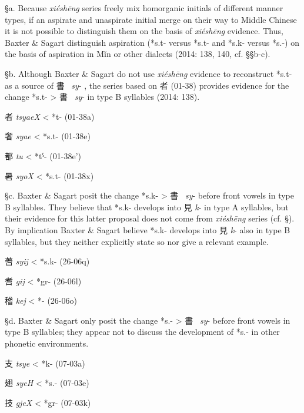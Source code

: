 §a. Because  \emph{xiéshēng} series freely mix homorganic initials of
different manner types, if an aspirate and unaspirate initial merge on
their way to Middle Chinese it is not possible to distinguish them on
the basis of  \emph{xiéshēng} evidence. Thus, Baxter \& Sagart
distinguish aspiration (*s.t- versus *s.t{}- and *s.k- versus *s.{}-) on
the basis of aspiration in Mǐn or other dialects (2014: 138, 140, cf.
§§b-c).

§b. Although Baxter \& Sagart do not use  \emph{xiéshēng} evidence to
reconstruct *s.t- as a source of 書~ \emph{sy}- 
\citeyearpar[135]{Baxter2014OldChinese}, the series
based on 者 (01-38) provides evidence for the change *s.t{}-
\textgreater{} 書~ \emph{sy}- in type B syllables (2014: 138).

\begin{description} \item
者  \emph{tsyaeX} \textless{} *t- (01-38a)
 \item
奢  \emph{syae} \textless{} *s.t{}- (01-38e)
\item
都  \emph{tu} \textless{} *tˁ- (01-38e')
 \item
暑  \emph{syoX} \textless{} *s.t{}- (01-38x)
\end{description}

§c. Baxter \& Sagart posit the change *s.k- \textgreater{} 書~ \emph{sy}-
before front vowels in type B syllables. They believe that *s.k-
develops into 見 \emph{k}- in type A syllables, but their evidence for
this latter proposal does not come from  \emph{xiéshēng} series (cf. §).
By implication Baxter \& Sagart believe *s.k- develops into 見 \emph{k}-
also in type B syllables, but they neither explicitly state so nor give
a relevant example.

\begin{description} \item
蓍  \emph{syij} \textless{} *s.k- (26-06q)
\item
耆  \emph{gij} \textless{} *gr- (26-06l)
\item
稽  \emph{kej} \textless{} *{}- (26-06o)
\end{description}

§d. Baxter \& Sagart only posit the change *s.{}- \textgreater{}
書~ \emph{sy}- before front vowels in type B syllables; they appear not
to discuss the development of *s.{}- in other phonetic environments.

\begin{description} \item
支  \emph{tsye} \textless{} *k- (07-03a)
 \item
翅  \emph{syeH} \textless{} *s.{}- (07-03e)
 \item
技  \emph{gjeX} \textless{} *gr- (07-03k)
\end{description}

